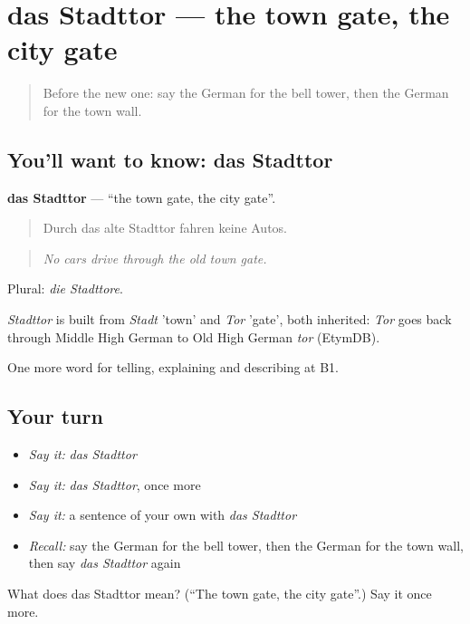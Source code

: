 \section[das Stadttor]{das Stadttor — the town gate, the city gate}

\label{lesson:GE-C438-stadttor}



\begin{quote}
Before the new one: say the German for the bell tower, then the German for the town wall.
\end{quote}

\subsection*{You'll want to know: das Stadttor}
\textbf{das Stadttor} — \textquotedblleft{}the town gate, the city gate\textquotedblright{}.

\begin{quote}
Durch das alte Stadttor fahren keine Autos.
\end{quote}

\begin{quote}
\emph{No cars drive through the old town gate.}
\end{quote}

Plural: \emph{die Stadttore}.

\begin{cousinweb}
\emph{Stadttor} is built from \emph{Stadt} 'town' and \emph{Tor} 'gate', both inherited: \emph{Tor} goes back through Middle High German to Old High German \emph{tor} (EtymDB).
\end{cousinweb}

\begin{grammarlens}[title={What you've built}]
One more word for telling, explaining and describing at B1.
\end{grammarlens}

\subsection*{Your turn}
\begin{itemize}
\raggedright
  \item \emph{Say it:} \emph{das Stadttor}
  \item \emph{Say it:} \emph{das Stadttor}, once more
  \item \emph{Say it:} a sentence of your own with \emph{das Stadttor}
  \item \emph{Recall:} say the German for the bell tower, then the German for the town wall, then say \emph{das Stadttor} again
\end{itemize}

\begin{tcolorbox}[breakable,colback=teal!4,colframe=teal!35!black,title={Before you move on}]
What does das Stadttor mean? (\textquotedblleft{}The town gate, the city gate\textquotedblright{}.) Say it once more.
\end{tcolorbox}
